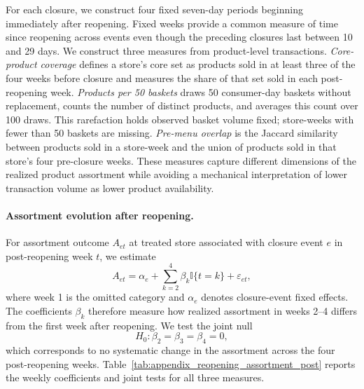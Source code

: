 \documentclass[11 pt]{article}
\begin{document}
For each closure, we construct four fixed seven-day periods beginning immediately after reopening. Fixed weeks provide a common measure of time since reopening across events even though the preceding closures last between 10 and 29 days. We construct three measures from product-level transactions. \textit{Core-product coverage} defines a store's core set as products sold in at least three of the four weeks before closure and measures the share of that set sold in each post-reopening week. \textit{Products per 50 baskets} draws 50 consumer-day baskets without replacement, counts the number of distinct products, and averages this count over 100 draws. This rarefaction holds observed basket volume fixed; store-weeks with fewer than 50 baskets are missing. \textit{Pre-menu overlap} is the Jaccard similarity between products sold in a store-week and the union of products sold in that store's four pre-closure weeks. These measures capture different dimensions of the realized product assortment while avoiding a mechanical interpretation of lower transaction volume as lower product availability.

\paragraph{Assortment evolution after reopening.}
For assortment outcome $A_{et}$ at treated store associated with closure event $e$ in post-reopening week $t$, we estimate
\begin{equation}
A_{et}
=
\alpha_e
+
\sum_{k=2}^{4}\beta_k
\mathbb{I}\{t=k\}
+
\varepsilon_{et},
\label{eq:assortment_post_path}
\end{equation}
where week 1 is the omitted category and $\alpha_e$ denotes closure-event fixed effects. The coefficients $\beta_k$ therefore measure how realized assortment in weeks 2--4 differs from the first week after reopening. We test the joint null
\[
H_0:\beta_2=\beta_3=\beta_4=0,
\]
which corresponds to no systematic change in the assortment across the four post-reopening weeks. Table~\ref{tab:appendix_reopening_assortment_post} reports the weekly coefficients and joint tests for all three measures.
\end{document}
